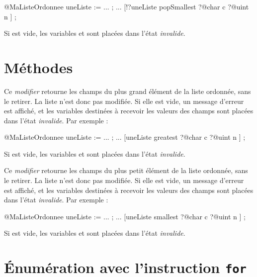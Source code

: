 \begin{galgascode}
@MaListeOrdonnee uneListe := ... ;
...
[!?uneListe popSmallest
  ?@char c
  ?@uint n
] ;
\end{galgascode}

Si  est vide, les variables  et  sont placées dans l'état \emph{invalide}.










\section{Méthodes}


Ce \emph{modifier} retourne les champs du plus grand élément de la liste ordonnée, sans le retirer. La liste n'est donc pas modifiée. Si elle est vide, un message d'erreur est affiché, et les variables destinées à recevoir les valeurs des champs sont placées dans l'état \emph{invalide}. Par exemple :

\begin{galgascode}
@MaListeOrdonnee uneListe := ... ;
...
[uneListe greatest
  ?@char c
  ?@uint n
] ;
\end{galgascode}

Si  est vide, les variables  et  sont placées dans l'état \emph{invalide}.



Ce \emph{modifier} retourne les champs du plus petit élément de la liste ordonnée, sans le retirer. La liste n'est donc pas modifiée. Si elle est vide, un message d'erreur est affiché, et les variables destinées à recevoir les valeurs des champs sont placées dans l'état \emph{invalide}. Par exemple :

\begin{galgascode}
@MaListeOrdonnee uneListe := ... ;
...
[uneListe smallest
  ?@char c
  ?@uint n
] ;
\end{galgascode}

Si  est vide, les variables  et  sont placées dans l'état \emph{invalide}.




\section{Énumération avec l'instruction \texttt{for}}

